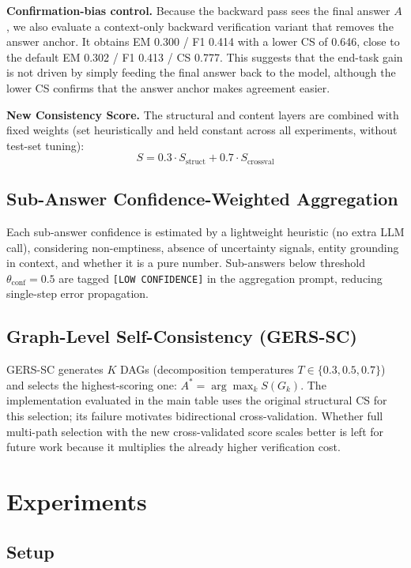 \documentclass[11pt,a4paper]{article}
\begin{document}
\textbf{Confirmation-bias control.} Because the backward pass sees the final answer $A$, we also evaluate a context-only backward verification variant that removes the answer anchor. It obtains EM 0.300 / F1 0.414 with a lower CS of 0.646, close to the default EM 0.302 / F1 0.413 / CS 0.777. This suggests that the end-task gain is not driven by simply feeding the final answer back to the model, although the lower CS confirms that the answer anchor makes agreement easier.

\textbf{New Consistency Score.} The structural and content layers are combined with fixed weights (set heuristically and held constant across all experiments, without test-set tuning):
\begin{equation}
S = 0.3\cdot S_{\text{struct}} + 0.7\cdot S_{\text{crossval}}
\end{equation}

\subsection{Sub-Answer Confidence-Weighted Aggregation}

Each sub-answer confidence is estimated by a lightweight heuristic (no extra LLM call), considering non-emptiness, absence of uncertainty signals, entity grounding in context, and whether it is a pure number. Sub-answers below threshold $\theta_{\text{conf}}=0.5$ are tagged \texttt{[LOW CONFIDENCE]} in the aggregation prompt, reducing single-step error propagation.

\subsection{Graph-Level Self-Consistency (GERS-SC)}

GERS-SC generates $K$ DAGs (decomposition temperatures $T\in\{0.3,0.5,0.7\}$) and selects the highest-scoring one: $A^*=\arg\max_k S(G_k)$. The implementation evaluated in the main table uses the original structural CS for this selection; its failure motivates bidirectional cross-validation. Whether full multi-path selection with the new cross-validated score scales better is left for future work because it multiplies the already higher verification cost.

\section{Experiments}

\subsection{Setup}
\end{document}
